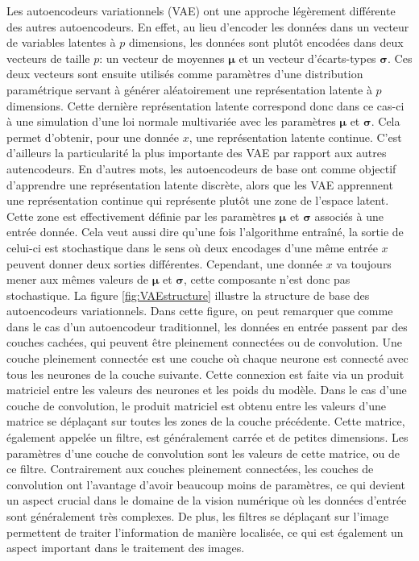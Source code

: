 Les autoencodeurs variationnels (VAE)  \cite{kingma2013autoencoding} ont une approche légèrement différente des autres autoencodeurs. En effet, au lieu d'encoder les données dans un vecteur de variables latentes à $p$ dimensions, les données sont plutôt encodées dans deux vecteurs de taille $p$: un vecteur de moyennes $\boldsymbol \mu$ et un vecteur d'écarts-types $\boldsymbol \sigma$. Ces deux vecteurs sont ensuite utilisés comme paramètres d'une distribution paramétrique servant à générer aléatoirement une représentation latente à $p$ dimensions. Cette dernière représentation latente correspond donc dans ce cas-ci à une simulation d'une loi normale multivariée avec les paramètres $\boldsymbol \mu$ et $\boldsymbol \sigma$. Cela permet d'obtenir, pour une donnée $x$, une représentation latente continue. C'est d'ailleurs la particularité la plus importante des VAE par rapport aux autres autencodeurs. En d'autres mots, les autoencodeurs de base ont comme objectif d'apprendre une représentation latente discrète, alors que les VAE apprennent une représentation continue qui représente plutôt une zone de l'espace latent. Cette zone est effectivement définie par les paramètres $\boldsymbol \mu$ et $\boldsymbol \sigma$ associés à une entrée donnée. Cela veut aussi dire qu'une fois l'algorithme entraîné, la sortie de celui-ci est stochastique dans le sens où deux encodages d'une même entrée $x$ peuvent donner deux sorties différentes. Cependant, une donnée $x$ va toujours mener aux mêmes valeurs de $\boldsymbol \mu$ et $\boldsymbol \sigma$, cette composante n'est donc pas stochastique. La figure \ref{fig:VAEstructure} illustre la structure de base des autoencodeurs variationnels. Dans cette figure, on peut remarquer que comme dans le cas d'un autoencodeur traditionnel, les données en entrée passent par des couches cachées, qui peuvent être pleinement connectées ou de convolution. Une couche pleinement connectée est une couche où chaque neurone est connecté avec tous les neurones de la couche suivante. Cette connexion est faite via un produit matriciel entre les valeurs des neurones et les poids du modèle. Dans le cas d'une couche de convolution, le produit matriciel est obtenu entre les valeurs d'une matrice se déplaçant sur toutes les zones de la couche précédente. Cette matrice, également appelée un filtre, est généralement carrée et de petites dimensions. Les paramètres d'une couche de convolution sont les valeurs de cette matrice, ou de ce filtre. Contrairement aux couches pleinement connectées, les couches de convolution ont l'avantage d'avoir beaucoup moins de paramètres, ce qui devient un aspect crucial dans le domaine de la vision numérique où les données d'entrée sont généralement très complexes. De plus, les filtres se déplaçant sur l'image permettent de traiter l'information de manière localisée, ce qui est également un aspect important dans le traitement des images.

